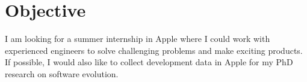 
\section{Objective}
I am looking for a summer internship in Apple where I could work with experienced engineers to solve challenging problems and make exciting products. If possible, I would also like to collect development data in Apple for my PhD research on software evolution.
